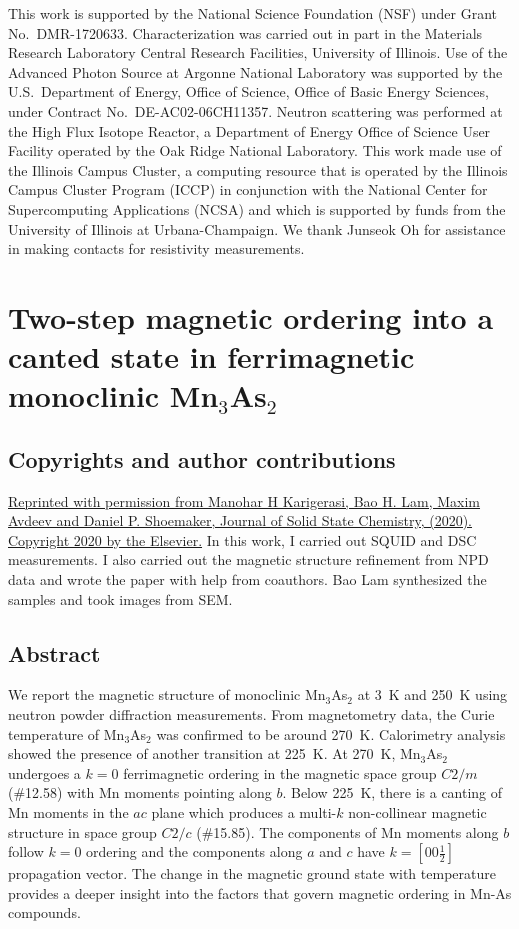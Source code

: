 \documentclass[10pt,doublespacing,edeposit]{uiucthesis2020}
\begin{document}
\begin{mainmatter}
This work is supported by the National Science Foundation (NSF) under Grant No.\ DMR-1720633.
Characterization was carried out in part in the Materials Research Laboratory Central Research Facilities, University of Illinois. Use of the Advanced Photon Source at Argonne National Laboratory was supported by the U.S.\ Department of Energy, Office of Science, Office of Basic Energy Sciences, under Contract No.\ DE-AC02-06CH11357. Neutron scattering was performed at the High Flux Isotope Reactor, a Department of Energy Office of Science User Facility operated by the Oak Ridge National Laboratory.
This work made use of the Illinois Campus Cluster, a computing resource that is operated by the Illinois Campus Cluster Program (ICCP) in conjunction with the National Center for Supercomputing Applications (NCSA) and which is supported by funds from the University of Illinois at Urbana-Champaign.
We thank Junseok Oh for assistance in making contacts for resistivity measurements.

\chapter{Two-step magnetic ordering into a canted state in ferrimagnetic monoclinic Mn$_3$As$_2$}

\section{Copyrights and author contributions}

\href{https://arxiv.org/abs/2008.01776}{Reprinted with permission from Manohar H Karigerasi, Bao H. Lam, Maxim Avdeev and Daniel P. Shoemaker, Journal of Solid State Chemistry, (2020). Copyright 2020 by the Elsevier.} In this work, I carried out SQUID and DSC measurements. I also carried out the magnetic structure refinement from NPD data and wrote the paper with help from coauthors. Bao Lam synthesized the samples and took images from SEM.


\section{Abstract}

We report the magnetic structure of monoclinic Mn$_3$As$_2$ at 3~K and 250~K using neutron powder diffraction measurements. From magnetometry data, the Curie temperature of Mn$_3$As$_2$ was confirmed to be around 270~K. Calorimetry analysis showed the presence of another transition at 225~K. At 270~K, Mn$_3$As$_2$ undergoes a $k = 0$ ferrimagnetic ordering in the magnetic space group $C2/m$ (\#12.58) with Mn moments pointing along $b$. Below 225~K, there is a canting of Mn moments in the $ac$ plane which produces a multi-$k$  non-collinear magnetic structure in space group $C2/c$ (\#15.85). The components of Mn moments along $b$ follow $k=0$ ordering and the components along $a$ and $c$ have $k = [0 0 \frac{1}{2}]$ propagation vector. The change in the magnetic ground state with temperature provides a deeper insight into the factors that govern magnetic ordering in Mn-As compounds.


\end{mainmatter}
\end{document}
